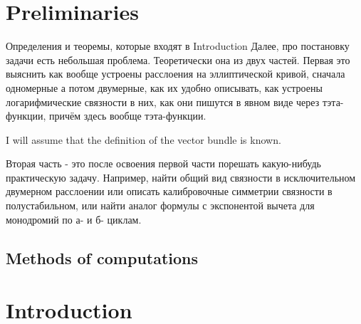 \documentclass[../main.tex]{subfiles}
\begin{document}
    \section*{Preliminaries} \label{sec:prelim}
    Определения и теоремы, которые входят в Introduction
    Далее, про постановку задачи есть небольшая проблема.
    Теоретически она из двух частей.
    Первая это выяснить как вообще устроены расслоения на эллиптической кривой, сначала одномерные а потом двумерные, как их удобно описывать, как устроены логарифмические связности в них, как они пишутся в явном виде через тэта-функции, причём здесь вообще тэта-функции.

    I will assume that the definition of the vector bundle is known.


    Вторая часть - это после освоения первой части порешать какую-нибудь практическую задачу. Например, найти общий вид связности в исключительном двумерном расслоении или описать калибровочные симметрии связности в полустабильном, или найти аналог формулы с экспонентой вычета для монодромий по а- и б- циклам.


    \subsection*{Methods of computations}\label{subsec:методы-явных-вычислений}


    \section*{Introduction}\label{sec:introduction}
\end{document}
